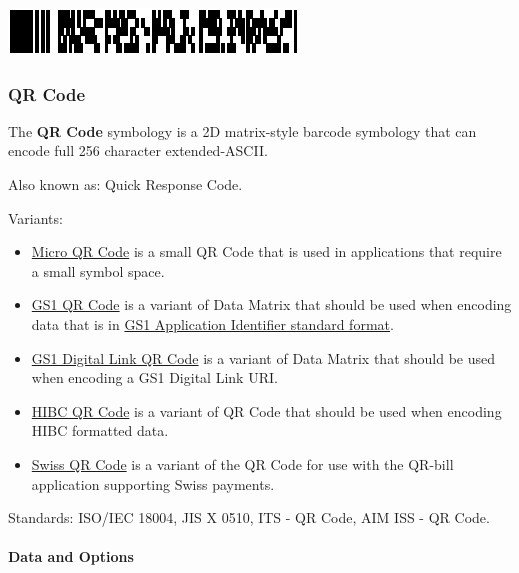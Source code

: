 \includegraphics{images/pdf417-3.eps}

\hypertarget{qr-code}{%
\subsubsection{QR Code}\label{qr-code}}

The \textbf{QR Code} symbology is a 2D matrix-style barcode symbology
that can encode full 256 character extended-ASCII.

Also known as: Quick Response Code.

Variants:

\begin{itemize}
\tightlist
\item
  \protect\hyperlink{micro-qr-code}{Micro QR Code} is a small QR Code
  that is used in applications that require a small symbol space.
\item
  \protect\hyperlink{gs1-qr-code}{GS1 QR Code} is a variant of Data
  Matrix that should be used when encoding data that is in
  \protect\hyperlink{gs1-application-identifier-standard-format}{GS1
  Application Identifier standard format}.
\item
  \protect\hyperlink{gs1-digital-link-qr-code}{GS1 Digital Link QR Code}
  is a variant of Data Matrix that should be used when encoding a GS1
  Digital Link URI.
\item
  \protect\hyperlink{hibc-symbols}{HIBC QR Code} is a variant of QR Code
  that should be used when encoding HIBC formatted data.
\item
  \protect\hyperlink{swiss-qr-code}{Swiss QR Code} is a variant of the
  QR Code for use with the QR-bill application supporting Swiss
  payments.
\end{itemize}

Standards: ISO/IEC 18004, JIS X 0510, ITS - QR Code, AIM ISS - QR Code.

\hypertarget{data-and-options-16}{%
\paragraph{Data and Options}\label{data-and-options-16}}


